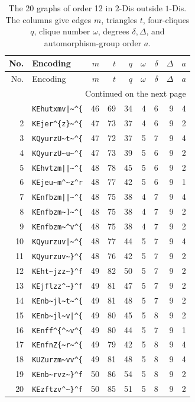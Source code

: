\begingroup\small
\setlength{\tabcolsep}{3pt}
\begin{longtable}{rlrrrrrrr}
\caption{The 20 graphs of order 12 in $2$-Dis outside $1$-Dis. The columns give edges $m$, triangles $t$, four-cliques $q$, clique number $\omega$, degrees $\delta,\Delta$, and automorphism-group order $a$.}\label{tab:strict}\\
\toprule
No. & Encoding & $m$ & $t$ & $q$ & $\omega$ & $\delta$ & $\Delta$ & $a$ \\
\midrule\endfirsthead
\toprule
No. & Encoding & $m$ & $t$ & $q$ & $\omega$ & $\delta$ & $\Delta$ & $a$ \\
\midrule\endhead
\midrule\multicolumn{9}{r}{Continued on the next page}\\
\endfoot\bottomrule\endlastfoot
1 & \verb+KEhutxmv|~^{+ & 46 & 69 & 34 & 4 & 6 & 9 & 4 \\
2 & \verb+KEjer^{z}~^{+ & 47 & 73 & 37 & 4 & 6 & 9 & 2 \\
3 & \verb+KQyurzU~t~^{+ & 47 & 72 & 37 & 5 & 7 & 9 & 4 \\
4 & \verb+KQyurzU~u~^{+ & 47 & 73 & 39 & 5 & 6 & 9 & 2 \\
5 & \verb+KEhvtzm||~^{+ & 48 & 78 & 45 & 5 & 6 & 9 & 2 \\
6 & \verb+KEjeu~m^~z^r+ & 48 & 77 & 42 & 5 & 6 & 9 & 1 \\
7 & \verb+KEnfbzm||~^{+ & 48 & 75 & 38 & 4 & 7 & 9 & 4 \\
8 & \verb+KEnfbzm~]~^{+ & 48 & 75 & 38 & 4 & 7 & 9 & 2 \\
9 & \verb+KEnfbzm~^v^{+ & 48 & 75 & 38 & 4 & 7 & 9 & 2 \\
10 & \verb+KQyurzuv|~^{+ & 48 & 77 & 44 & 5 & 7 & 9 & 4 \\
11 & \verb+KQyurzuv~}^{+ & 48 & 76 & 42 & 5 & 7 & 9 & 2 \\
12 & \verb+KEht~jzz~}^f+ & 49 & 82 & 50 & 5 & 7 & 9 & 2 \\
13 & \verb+KEjflzz^~}^f+ & 49 & 81 & 47 & 5 & 7 & 9 & 2 \\
14 & \verb+KEnb~jl~t~^{+ & 49 & 81 & 48 & 5 & 7 & 9 & 2 \\
15 & \verb+KEnb~jl~v|^{+ & 49 & 80 & 45 & 5 & 8 & 9 & 2 \\
16 & \verb+KEnff^{^~v^{+ & 49 & 80 & 44 & 5 & 7 & 9 & 1 \\
17 & \verb+KEnfnZ{~r~^{+ & 49 & 79 & 42 & 5 & 8 & 9 & 4 \\
18 & \verb+KUZurzm~vv^{+ & 49 & 81 & 48 & 5 & 8 & 9 & 4 \\
19 & \verb+KEnb~rvz~}^f+ & 50 & 86 & 54 & 5 & 8 & 9 & 2 \\
20 & \verb+KEzftzv^~}^f+ & 50 & 85 & 51 & 5 & 8 & 9 & 2 \\
\end{longtable}\endgroup
